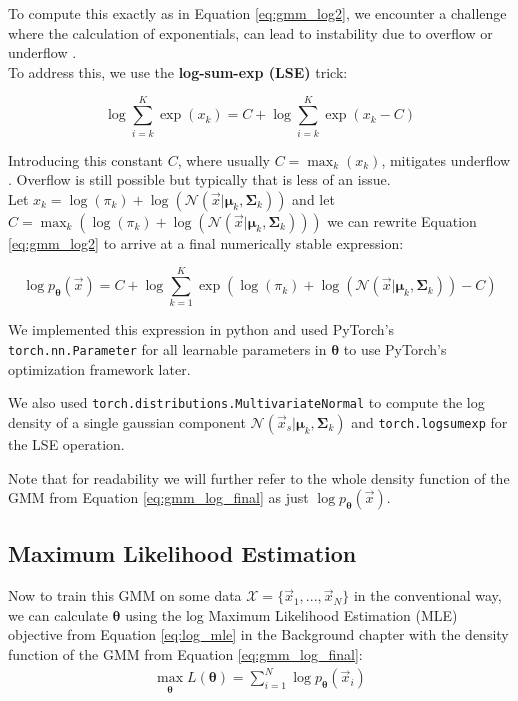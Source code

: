 To compute this exactly as in Equation \ref{eq:gmm_log2}, we encounter a challenge where the calculation of exponentials, can lead to instability due to overflow or underflow \cite{logsumexp}. \\
To address this, we use the \textbf{log-sum-exp (LSE)} \cite{logsumexp} trick:

\[
    \log \sum_{i=k}^K \exp(x_k) = C + \log \sum_{i=k}^K \exp(x_k - C)
\]

Introducing this constant $C$, where usually $C = \max_k (x_k)$, mitigates underflow \cite{logsumexp}. Overflow is still possible 
but typically that is less of an issue. \\

Let $x_k = \log(\pi_k) + \log \left(\mathcal{N}(\vec x | \boldsymbol{\mu}_k, \boldsymbol{\Sigma}_k)\right)$ and 
let $C = \max_k \left( \log(\pi_k) + \log \left( \mathcal{N}(\vec x | \boldsymbol{\mu}_k, \boldsymbol{\Sigma}_k) \right) \right) $ we can rewrite 
Equation \ref{eq:gmm_log2} to arrive at a final numerically stable expression: 

\begin{equation}
    \log p_{\boldsymbol{\theta}}(\vec x) = C + \log \sum_{k=1}^K \exp\left( \log(\pi_k) + \log \left( \mathcal{N}(\vec x | \boldsymbol{\mu}_k, \boldsymbol{\Sigma}_k) \right) - C \right)
    \label{eq:gmm_log_final}
\end{equation}

We implemented this expression in python and used PyTorch's \cite{pytorch} \texttt{torch.nn.Parameter}
for all learnable parameters in $\boldsymbol{\theta}$ to use PyTorch's optimization framework later.

We also used \texttt{torch.distributions.MultivariateNormal} to compute the log density of a single 
gaussian component $\mathcal{N}(\vec x_s|\boldsymbol{\mu}_k, \boldsymbol{\Sigma}_k)$ and \texttt{torch.logsumexp}
for the LSE operation.  

Note that for readability we will further refer to the whole density function of the GMM from Equation \ref{eq:gmm_log_final} as just 
$\log p_{\boldsymbol{\theta}}(\vec x)$.

\subsection{Maximum Likelihood Estimation}
\label{sec:gmm_mle}

Now to train this GMM on some data $\mathcal{X} = \{\vec x_1, ..., \vec x_N\}$ in the conventional way, we can calculate $\boldsymbol{\theta}$ using the 
log Maximum Likelihood Estimation (MLE) objective from Equation \ref{eq:log_mle} in the Background chapter with the density function
of the GMM from Equation \ref{eq:gmm_log_final}:
\begin{align}
    \max_{\substack{\boldsymbol{\theta}}} L(\boldsymbol{\theta}) = \sum_{i=1}^{N} \log p_{\boldsymbol{\theta}}(\vec x_i)
    \label{eq:gmm_objective}
\end{align}

